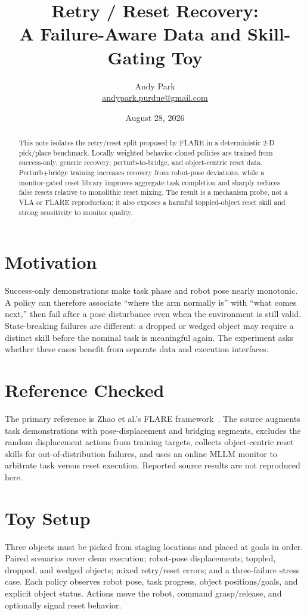 \documentclass[11pt]{article}
\title{Retry / Reset Recovery:\\A Failure-Aware Data and Skill-Gating Toy}
\author{Andy Park\\\href{mailto:andypark.purdue@gmail.com}{andypark.purdue@gmail.com}}
\date{August 28, 2026}
\begin{document}
\maketitle

\begin{abstract}
This note isolates the retry/reset split proposed by FLARE in a deterministic 2-D pick/place benchmark. Locally weighted behavior-cloned policies are trained from success-only, generic recovery, perturb-to-bridge, and object-centric reset data. Perturb+bridge training increases recovery from robot-pose deviations, while a monitor-gated reset library improves aggregate task completion and sharply reduces false resets relative to monolithic reset mixing. The result is a mechanism probe, not a VLA or FLARE reproduction; it also exposes a harmful toppled-object reset skill and strong sensitivity to monitor quality.
\end{abstract}

\section{Motivation}
Success-only demonstrations make task phase and robot pose nearly monotonic. A policy can therefore associate ``where the arm normally is'' with ``what comes next,'' then fail after a pose disturbance even when the environment is still valid. State-breaking failures are different: a dropped or wedged object may require a distinct skill before the nominal task is meaningful again. The experiment asks whether these cases benefit from separate data and execution interfaces.

\section{Reference Checked}
The primary reference is Zhao et al.'s FLARE framework~\cite{flare}. The source augments task demonstrations with pose-displacement and bridging segments, excludes the random displacement actions from training targets, collects object-centric reset skills for out-of-distribution failures, and uses an online MLLM monitor to arbitrate task versus reset execution. Reported source results are not reproduced here.

\section{Toy Setup}
Three objects must be picked from staging locations and placed at goals in order. Paired scenarios cover clean execution; robot-pose displacements; toppled, dropped, and wedged objects; mixed retry/reset errors; and a three-failure stress case. Each policy observes robot pose, task progress, object positions/goals, and explicit object status. Actions move the robot, command grasp/release, and optionally signal reset behavior.
\end{document}
